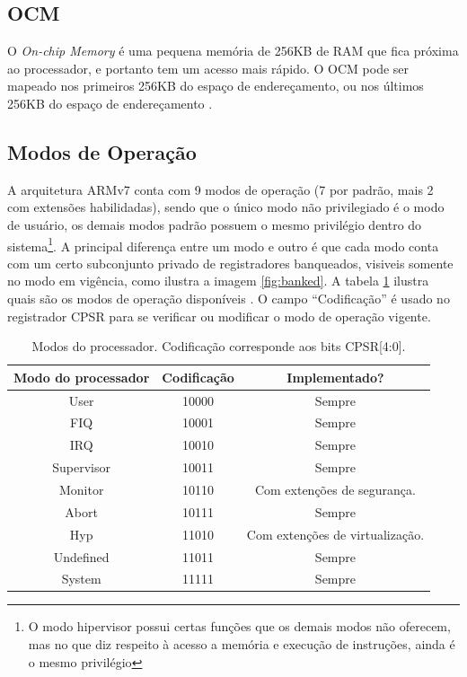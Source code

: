 \subsection{OCM} O \emph{On-chip Memory} é uma pequena memória de 256KB de RAM que fica próxima ao processador, e portanto tem um acesso mais rápido. O OCM pode ser mapeado nos primeiros 256KB do espaço de endereçamento, ou nos últimos 256KB do espaço de endereçamento \cite{ug585}.


\subsection{Modos de Operação}
\label{sec:operating_modes}
A arquitetura ARMv7 conta com 9 modos de operação (7 por padrão, mais 2 com extensões habilidadas), sendo que o único modo não privilegiado é o modo de usuário, os demais modos padrão possuem o mesmo privilégio dentro do sistema\footnote{O modo hipervisor possui certas funções que os demais modos não oferecem, mas no que diz respeito à acesso a memória e execução de instruções, ainda é o mesmo privilégio}. A principal diferença entre um modo e outro é que cada modo conta com um certo subconjunto privado de registradores banqueados, visiveis somente no modo em vigência, como ilustra a imagem \ref{fig:banked}. A tabela \ref{tab:processormode} ilustra quais são os modos de operação disponíveis \cite[p.~1139]{armarm}.
O campo ``Codificação'' é usado no registrador CPSR para se verificar ou modificar o modo de operação vigente.

\begin{table}[ht]
\centering
\begin{tabular}{ccc}
\hline\hline                        %
Modo do processador  & Codificação & Implementado?\\ [0.5ex] %
\hline                  %
User & 10000 & Sempre \\
FIQ & 10001 & Sempre \\
IRQ & 10010 & Sempre \\
Supervisor & 10011 & Sempre\\
Monitor & 10110 & Com extenções de segurança.\\
Abort & 10111 & Sempre\\
Hyp & 11010 & Com extenções de virtualização.\\
Undefined & 11011 & Sempre\\
System & 11111 & Sempre\\[1ex]
\hline %
\end{tabular}
\caption{Modos do processador. Codificação corresponde aos bits CPSR[4:0].}
\label{tab:processormode} %
\end{table}

